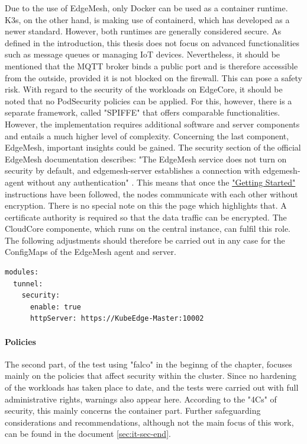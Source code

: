 \documentclass[MSC,Master,english]{twbook}%
\begin{document}
Due to the use of EdgeMesh, only Docker can be used as a container runtime. K3s, on the other hand, is making use of containerd, which has developed as a newer standard. However, both runtimes are generally considered secure. As defined in the introduction, this thesis does not focus on advanced functionalities such as message queues or managing IoT devices. Nevertheless, it should be mentioned that the MQTT broker binds a public port\cite{bk-gh-ke-node-test} and is therefore accessible from the outside, provided it is not blocked on the firewall. This can pose a safety risk. With regard to the security of the workloads on EdgeCore, it should be noted that no PodSecurity policies can be applied. For this, however, there is a separate framework, called "SPIFFE" that offers comparable functionalities\cite{ke-secure-fw}. However, the implementation requires additional software and server components and entails a much higher level of complexity. Concerning the last component, EdgeMesh, important insights could be gained. The security section of the official EdgeMesh documentation describes: "The EdgeMesh service does not turn on security by default, and edgemesh-server establishes a connection with edgemesh-agent without any authentication" \cite{em-security}. This means that once the \hyperref{https://edgemesh.netlify.app/guide/getting-started.html}{}{}{"Getting Started"}\cite{em-getstart} instructions have been followed, the nodes communicate with each other without encryption. There is no special note on this the page which highlights that. A certificate authority is required so that the data traffic can be encrypted. The CloudCore componente, which runs on the central instance, can fulfil this role. The following adjustments should therefore be carried out in any case for the ConfigMaps of the EdgeMesh agent and server.

\begin{lstlisting}[caption={EdgeMesh security\cite{bk-gh-ke-node-test}},captionpos=b]
modules:
  tunnel:
    security:
      enable: true
      httpServer: https://KubeEdge-Master:10002
\end{lstlisting}



\paragraph{Policies} The second part, of the test using "falco"\cite{falco-scan} in the beginng of the chapter, focuses mainly on the policies that affect security within the cluster. Since no hardening of the workloads has taken place to date, and the tests were carried out with full administrative rights, warnings also appear here. According to the "4Cs" of security, this mainly concerns the container part. Further safeguarding considerations and recommendations, although not the main focus of this work, can be found in the document \autoref{sec:it-sec-end}.
\end{document}
